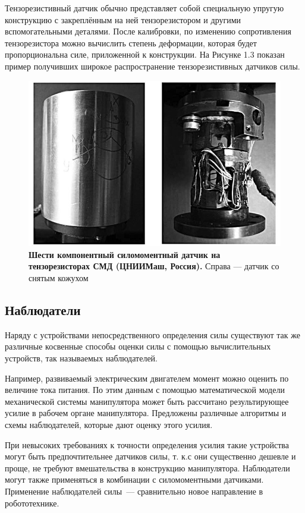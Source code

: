 \documentclass[a4paper,14pt,russian]{extreport} \usepackage{extsizes}
\begin{document}
	Тензорезистивный датчик обычно представляет собой специальную упругую конструкцию с закреплённым на ней тензорезистором и другими вспомогательными деталями. После калибровки, по изменению сопротивления тензорезистора можно вычислить степень деформации, которая будет пропорциональна силе, приложенной к конструкции. На Рисунке 1.3 показан пример получивших широкое распространение тензорезистивных датчиков силы.	
	\begin{figure}[ht]
		\centering		 
		\includegraphics[width=6in]{./img/img13.jpg}	
		\caption{
			\textbf{Шести компонентный силомоментный датчик
				на тензорезисторах СМД (ЦНИИМаш, Россия).}
				Справа — датчик со снятым кожухом
		}     
		\label{fig_img13}
	\end{figure}
	\subsection {Наблюдатели}
	Наряду с устройствами непосредственного определения силы
	существуют так же различные косвенные способы оценки силы с помощью вычислительных устройств, так называемых наблюдателей.
	
	Например, развиваемый электрическим двигателем момент можно
	оценить по величине тока питания. По этим данным с помощью
	математической модели механической системы манипулятора
	может быть рассчитано результирующее усилие в рабочем органе
	манипулятора. Предложены различные алгоритмы и схемы наблюдателей, которые дают оценку этого усилия.
	
	При невысоких требованиях к точности определения усилия
	такие устройства могут быть предпочтительнее датчиков силы, т. к.с 
	они существенно дешевле и проще, не требуют вмешательства
	в конструкцию манипулятора. Наблюдатели могут также применяться в комбинации с силомоментными датчиками.
	Применение наблюдателей силы~--- сравнительно новое направление в робототехнике.
\end{document}
